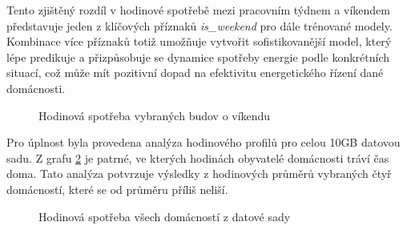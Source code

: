 \documentclass[FM,BP,fonts]{tulthesis}
\begin{document}
Tento zjištěný rozdíl v hodinové spotřebě mezi pracovním týdnem a víkendem představuje jeden z klíčových příznaků \textit{is\_weekend} pro dále trénované modely. Kombinace  více příznaků totiž umožňuje vytvořit sofistikovanější model, který lépe predikuje a přizpůsobuje se dynamice spotřeby energie podle konkrétních situací, což může mít pozitivní dopad na efektivitu energetického řízení dané domácnosti.


\newpage

\begin{figure}[htbp]
	\centering
	\caption{Hodinová spotřeba vybraných budov o víkendu}
	\label{fig:hodina_vikend}
\end{figure}

Pro úplnost byla provedena analýza hodinového profilů pro celou 10GB datovou sadu. Z grafu \ref{fig:hodina_all} je patrné, ve kterých hodinách obyvatelé domácnosti tráví čas doma. Tato analýza potvrzuje výsledky z hodinových průměrů vybraných čtyř domácností, které se od průměru příliš neliší.

\begin{figure}[htbp]
	\centering
	\caption{Hodinová spotřeba všech domácností z datové sady}
	\label{fig:hodina_all}
\end{figure}
\end{document}
